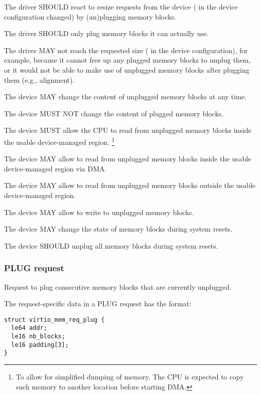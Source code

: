 The driver SHOULD react to resize requests from the device
( in the device configuration changed) by
(un)plugging memory blocks.

The driver SHOULD only plug memory blocks it can actually use.

The driver MAY not reach the requested size ( in the
device configuration), for example, because it cannot free up any plugged
memory blocks to unplug them, or it would not be able to make use of
unplugged memory blocks after plugging them (e.g., alignment).


The device MAY change the content of unplugged memory blocks at any time.

The device MUST NOT change the content of plugged memory blocks.

The device MUST allow the CPU to read from unplugged memory blocks inside
the usable device-managed region. \footnote{To allow for simplified dumping of
memory. The CPU is expected to copy such memory to another location before
starting DMA.}

The device MAY allow to read from unplugged memory blocks inside the
usable device-managed region via DMA.

The device MAY allow to read from unplugged memory blocks outside
the usable device-managed region.

The device MAY allow to write to unplugged memory blocks.

The device MAY change the state of memory blocks during system resets.

The device SHOULD unplug all memory blocks during system resets.

\subsubsection{PLUG request}\label{sec:Device Types / Memory Device / Device Operation / PLUG request}

Request to plug consecutive memory blocks that are currently unplugged.

The request-specific data in a PLUG request has the format:

\begin{lstlisting}
struct virtio_mem_req_plug {
  le64 addr;
  le16 nb_blocks;
  le16 padding[3];
}
\end{lstlisting}

